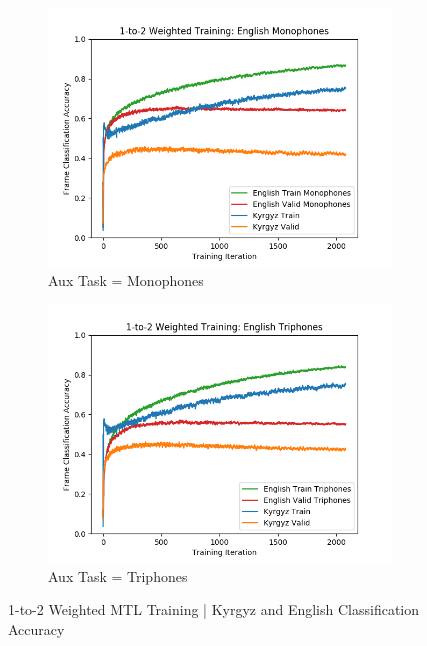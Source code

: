 \documentclass[a4paper]{article}
\begin{document}
\begin{figure}[!htbp]
\centering
\begin{subfigure}{.25\textwidth}
  \centering
  \includegraphics[width=1.1\textwidth,keepaspectratio]{figs/1-to-2-mono.png}
  \caption{Aux Task = Monophones}
  \label{fig:sub1}
\end{subfigure}%
\begin{subfigure}{.25\textwidth}
  \centering
  \includegraphics[width=1.1\textwidth,keepaspectratio]{figs/1-to-2-tri.png}
  \caption{Aux Task = Triphones}
  \label{fig:sub2}
\end{subfigure}
\caption{1-to-2 Weighted MTL Training | Kyrgyz and English Classification Accuracy}
\label{fig:1-to-2}
\end{figure}
\end{document}
